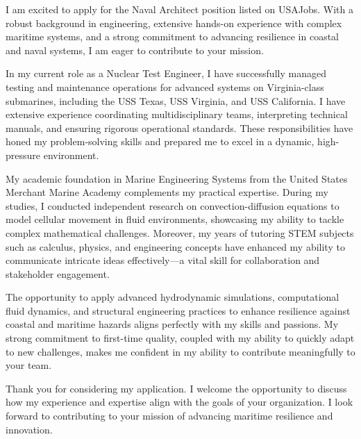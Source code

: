 I am excited to apply for the Naval Architect position listed on USAJobs. With a robust background in engineering, extensive hands-on experience with complex maritime systems, and a strong commitment to advancing resilience in coastal and naval systems, I am eager to contribute to your mission.

In my current role as a Nuclear Test Engineer, I have successfully managed testing and maintenance operations for advanced systems on Virginia-class submarines, including the USS Texas, USS Virginia, and USS California. I have extensive experience coordinating multidisciplinary teams, interpreting technical manuals, and ensuring rigorous operational standards. These responsibilities have honed my problem-solving skills and prepared me to excel in a dynamic, high-pressure environment.

My academic foundation in Marine Engineering Systems from the United States Merchant Marine Academy complements my practical expertise. During my studies, I conducted independent research on convection-diffusion equations to model cellular movement in fluid environments, showcasing my ability to tackle complex mathematical challenges. Moreover, my years of tutoring STEM subjects such as calculus, physics, and engineering concepts have enhanced my ability to communicate intricate ideas effectively—a vital skill for collaboration and stakeholder engagement.

The opportunity to apply advanced hydrodynamic simulations, computational fluid dynamics, and structural engineering practices to enhance resilience against coastal and maritime hazards aligns perfectly with my skills and passions. My strong commitment to first-time quality, coupled with my ability to quickly adapt to new challenges, makes me confident in my ability to contribute meaningfully to your team.

Thank you for considering my application. I welcome the opportunity to discuss how my experience and expertise align with the goals of your organization. I look forward to contributing to your mission of advancing maritime resilience and innovation.
